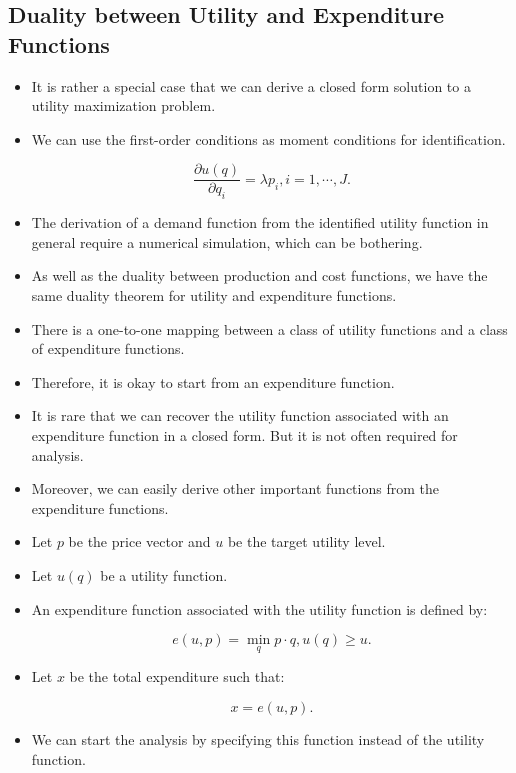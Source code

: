\documentclass[]{book}
\providecommand{\tightlist}{%
  \setlength{\itemsep}{0pt}\setlength{\parskip}{0pt}}
\begin{document}
\subsection{Duality between Utility and Expenditure
Functions}\label{duality-between-utility-and-expenditure-functions}

\begin{itemize}
\tightlist
\item
  It is rather a special case that we can derive a closed form solution
  to a utility maximization problem.
\item
  We can use the first-order conditions as moment conditions for
  identification.

  \begin{equation}
  \frac{\partial u(q)}{\partial q_i} = \lambda p_i, i = 1, \cdots, J.
  \end{equation}
\item
  The derivation of a demand function from the identified utility
  function in general require a numerical simulation, which can be
  bothering.
\item
  As well as the duality between production and cost functions, we have
  the same duality theorem for utility and expenditure functions.
\item
  There is a one-to-one mapping between a class of utility functions and
  a class of expenditure functions.
\item
  Therefore, it is okay to start from an expenditure function.
\item
  It is rare that we can recover the utility function associated with an
  expenditure function in a closed form. But it is not often required
  for analysis.
\item
  Moreover, we can easily derive other important functions from the
  expenditure functions.
\item
  Let \(p\) be the price vector and \(u\) be the target utility level.
\item
  Let \(u(q)\) be a utility function.
\item
  An expenditure function associated with the utility function is
  defined by:

  \begin{equation}
  e(u, p) = \min_{q} p \cdot q, u(q) \ge u.
  \end{equation}
\item
  Let \(x\) be the total expenditure such that:

  \begin{equation}
  x = e(u, p).
  \end{equation}
\item
  We can start the analysis by specifying this function instead of the
  utility function.
\end{itemize}
\end{document}

